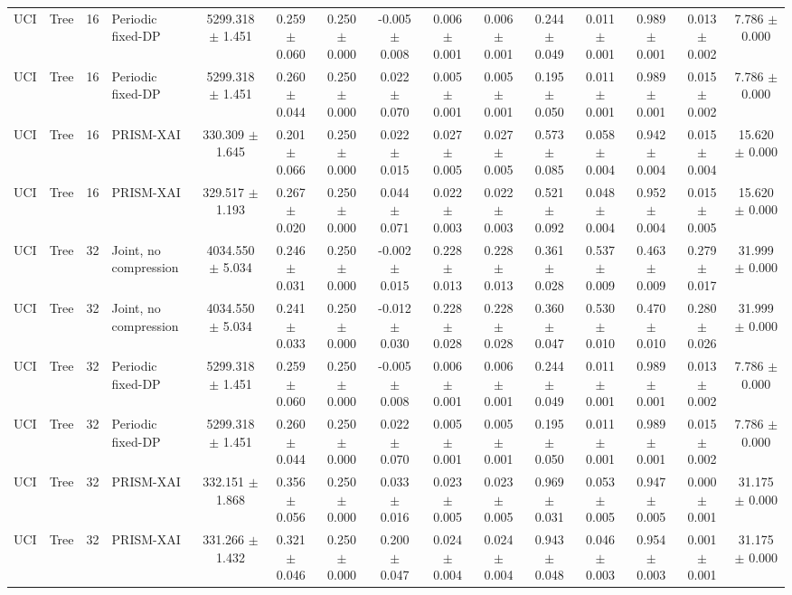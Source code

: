 \begin{tabular}{llllccccccccccc}
UCI & Tree & 16 & Periodic fixed-DP & 5299.318 $\pm$ 1.451 & 0.259 $\pm$ 0.060 & 0.250 $\pm$ 0.000 & -0.005 $\pm$ 0.008 & 0.006 $\pm$ 0.001 & 0.006 $\pm$ 0.001 & 0.244 $\pm$ 0.049 & 0.011 $\pm$ 0.001 & 0.989 $\pm$ 0.001 & 0.013 $\pm$ 0.002 & 7.786 $\pm$ 0.000 \\
UCI & Tree & 16 & Periodic fixed-DP & 5299.318 $\pm$ 1.451 & 0.260 $\pm$ 0.044 & 0.250 $\pm$ 0.000 & 0.022 $\pm$ 0.070 & 0.005 $\pm$ 0.001 & 0.005 $\pm$ 0.001 & 0.195 $\pm$ 0.050 & 0.011 $\pm$ 0.001 & 0.989 $\pm$ 0.001 & 0.015 $\pm$ 0.002 & 7.786 $\pm$ 0.000 \\
UCI & Tree & 16 & PRISM-XAI & 330.309 $\pm$ 1.645 & 0.201 $\pm$ 0.066 & 0.250 $\pm$ 0.000 & 0.022 $\pm$ 0.015 & 0.027 $\pm$ 0.005 & 0.027 $\pm$ 0.005 & 0.573 $\pm$ 0.085 & 0.058 $\pm$ 0.004 & 0.942 $\pm$ 0.004 & 0.015 $\pm$ 0.004 & 15.620 $\pm$ 0.000 \\
UCI & Tree & 16 & PRISM-XAI & 329.517 $\pm$ 1.193 & 0.267 $\pm$ 0.020 & 0.250 $\pm$ 0.000 & 0.044 $\pm$ 0.071 & 0.022 $\pm$ 0.003 & 0.022 $\pm$ 0.003 & 0.521 $\pm$ 0.092 & 0.048 $\pm$ 0.004 & 0.952 $\pm$ 0.004 & 0.015 $\pm$ 0.005 & 15.620 $\pm$ 0.000 \\
UCI & Tree & 32 & Joint, no compression & 4034.550 $\pm$ 5.034 & 0.246 $\pm$ 0.031 & 0.250 $\pm$ 0.000 & -0.002 $\pm$ 0.015 & 0.228 $\pm$ 0.013 & 0.228 $\pm$ 0.013 & 0.361 $\pm$ 0.028 & 0.537 $\pm$ 0.009 & 0.463 $\pm$ 0.009 & 0.279 $\pm$ 0.017 & 31.999 $\pm$ 0.000 \\
UCI & Tree & 32 & Joint, no compression & 4034.550 $\pm$ 5.034 & 0.241 $\pm$ 0.033 & 0.250 $\pm$ 0.000 & -0.012 $\pm$ 0.030 & 0.228 $\pm$ 0.028 & 0.228 $\pm$ 0.028 & 0.360 $\pm$ 0.047 & 0.530 $\pm$ 0.010 & 0.470 $\pm$ 0.010 & 0.280 $\pm$ 0.026 & 31.999 $\pm$ 0.000 \\
UCI & Tree & 32 & Periodic fixed-DP & 5299.318 $\pm$ 1.451 & 0.259 $\pm$ 0.060 & 0.250 $\pm$ 0.000 & -0.005 $\pm$ 0.008 & 0.006 $\pm$ 0.001 & 0.006 $\pm$ 0.001 & 0.244 $\pm$ 0.049 & 0.011 $\pm$ 0.001 & 0.989 $\pm$ 0.001 & 0.013 $\pm$ 0.002 & 7.786 $\pm$ 0.000 \\
UCI & Tree & 32 & Periodic fixed-DP & 5299.318 $\pm$ 1.451 & 0.260 $\pm$ 0.044 & 0.250 $\pm$ 0.000 & 0.022 $\pm$ 0.070 & 0.005 $\pm$ 0.001 & 0.005 $\pm$ 0.001 & 0.195 $\pm$ 0.050 & 0.011 $\pm$ 0.001 & 0.989 $\pm$ 0.001 & 0.015 $\pm$ 0.002 & 7.786 $\pm$ 0.000 \\
UCI & Tree & 32 & PRISM-XAI & 332.151 $\pm$ 1.868 & 0.356 $\pm$ 0.056 & 0.250 $\pm$ 0.000 & 0.033 $\pm$ 0.016 & 0.023 $\pm$ 0.005 & 0.023 $\pm$ 0.005 & 0.969 $\pm$ 0.031 & 0.053 $\pm$ 0.005 & 0.947 $\pm$ 0.005 & 0.000 $\pm$ 0.001 & 31.175 $\pm$ 0.000 \\
UCI & Tree & 32 & PRISM-XAI & 331.266 $\pm$ 1.432 & 0.321 $\pm$ 0.046 & 0.250 $\pm$ 0.000 & 0.200 $\pm$ 0.047 & 0.024 $\pm$ 0.004 & 0.024 $\pm$ 0.004 & 0.943 $\pm$ 0.048 & 0.046 $\pm$ 0.003 & 0.954 $\pm$ 0.003 & 0.001 $\pm$ 0.001 & 31.175 $\pm$ 0.000 \\
\bottomrule
\end{tabular}
